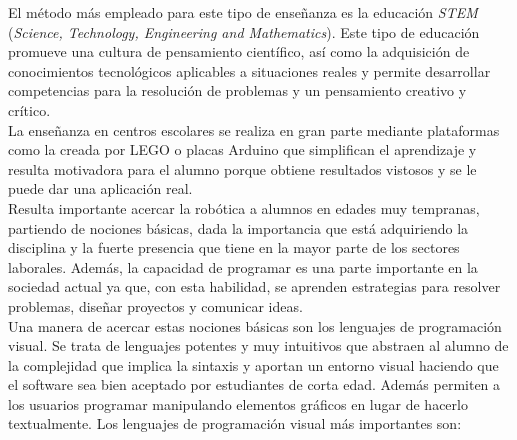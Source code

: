 El método más empleado para este tipo de enseñanza es la educación \textit{STEM} (\textit{Science, Technology, Engineering and Mathematics}). Este tipo de educación promueve una cultura de pensamiento científico, así como la adquisición de conocimientos tecnológicos aplicables a situaciones reales y permite desarrollar competencias para la resolución de problemas y un pensamiento creativo y crítico.   \\


La enseñanza en centros escolares se realiza en gran parte mediante plataformas como la creada por LEGO o placas Arduino que simplifican el aprendizaje y resulta motivadora para el alumno porque obtiene resultados vistosos y se le puede dar una aplicación real. \\

Resulta importante acercar la robótica a alumnos en edades muy tempranas, partiendo de nociones básicas, dada la importancia que está adquiriendo la disciplina y la fuerte presencia que tiene en la mayor parte de los sectores laborales. Además, la capacidad de programar es una parte importante en la sociedad actual ya que, con esta habilidad, se aprenden estrategias para resolver problemas, diseñar proyectos y comunicar ideas. \\


Una manera de acercar estas nociones básicas son los lenguajes de programación visual. Se trata de lenguajes potentes y muy intuitivos que abstraen al alumno de la complejidad que implica la sintaxis y aportan un entorno visual haciendo que el software sea bien aceptado por estudiantes de corta edad. Además permiten a los usuarios programar manipulando elementos gráficos en lugar de hacerlo textualmente. Los lenguajes de programación visual más importantes son: 


